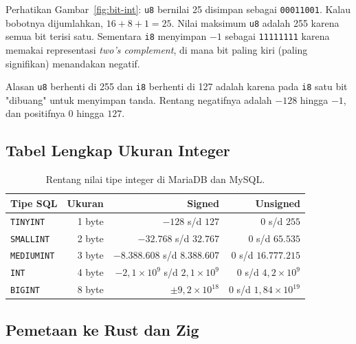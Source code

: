 \documentclass[11pt,a4paper]{article}
\begin{document}
Perhatikan Gambar~\ref{fig:bit-int}: \texttt{u8} bernilai 25 disimpan sebagai \texttt{00011001}. Kalau bobotnya dijumlahkan, $16 + 8 + 1 = 25$. Nilai maksimum \texttt{u8} adalah 255 karena semua bit terisi satu. Sementara \texttt{i8} menyimpan $-1$ sebagai \texttt{11111111} karena memakai representasi \textit{two's complement}, di mana bit paling kiri (paling signifikan) menandakan negatif.

Alasan \texttt{u8} berhenti di 255 dan \texttt{i8} berhenti di 127 adalah karena pada \texttt{i8} satu bit "dibuang" untuk menyimpan tanda. Rentang negatifnya adalah $-128$ hingga $-1$, dan positifnya $0$ hingga $127$.

\subsection{Tabel Lengkap Ukuran Integer}

\begin{table}[H]
	\centering
	\caption{Rentang nilai tipe integer di MariaDB dan MySQL.}
	\label{tab:int-sql}
	\small
	\begin{tabular}{l r r r}
		\toprule
		Tipe SQL           & Ukuran & Signed                                       & Unsigned                        \\
		\midrule
		\texttt{TINYINT}   & 1 byte & $-128$ s/d $127$                             & $0$ s/d $255$                   \\
		\texttt{SMALLINT}  & 2 byte & $-32.768$ s/d $32.767$                       & $0$ s/d $65.535$                \\
		\texttt{MEDIUMINT} & 3 byte & $-8.388.608$ s/d $8.388.607$                 & $0$ s/d $16.777.215$            \\
		\texttt{INT}       & 4 byte & $-2{,}1 \times 10^9$ s/d $2{,}1 \times 10^9$ & $0$ s/d $4{,}2 \times 10^9$     \\
		\texttt{BIGINT}    & 8 byte & $\pm 9{,}2 \times 10^{18}$                   & $0$ s/d $1{,}84 \times 10^{19}$ \\
		\bottomrule
	\end{tabular}
\end{table}

\subsection{Pemetaan ke Rust dan Zig}
\end{document}
